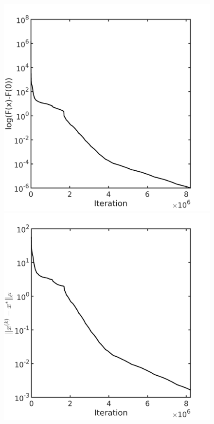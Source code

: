 \documentclass[final,1p,times]{elsarticle}
\begin{document}
\begin{figure}[!htbp]
	\centering
	  \includegraphics[scale=0.15]{../figures/woods320D.png}
	  \includegraphics[scale=0.15]{../figures/woods320D_dist.png}
\end{figure}
\end{document}
